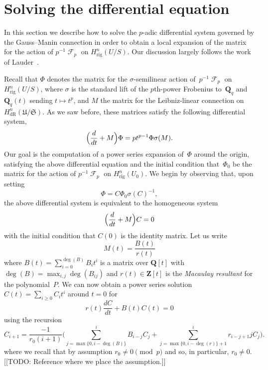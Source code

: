 \documentclass[a4paper,11pt]{article}
\numberwithin{equation}{section}
\DeclareMathOperator{\Frob}{\mathcal{F}} %
\providecommand{\HdR}{H_{\text{dR}}}    %
\providecommand{\Hrig}{H_{\text{rig}}}  %
\theoremstyle{definition}
\begin{document}

\section{Solving the differential equation}
\label{sec:DifferentialSystem}

In this section we describe how to solve the $p$-adic differential 
system governed by the Gauss--Manin connection in order to obtain 
a local expansion of the matrix for the action of $p^{-1} \Frob_p$ 
on $\Hrig^{n}(U/S)$.  Our discussion largely follows the work of 
Lauder~\citep{Lauder2006}.

Recall that $\Phi$ denotes the matrix for the $\sigma$-semilinear action 
of~$p^{-1} \Frob_p$ on $\Hrig^{n}(U/S)$, where $\sigma$ is the standard lift 
of the $p$th-power Frobenius to~$\mathbf{Q}_q$ and~$\mathbf{Q}_q(t)$ sending 
$t \mapsto t^p$, and $M$ the matrix for the Leibniz-linear connection on 
$\HdR^n(\mathfrak{U}/\mathfrak{S})$.
As we saw before, these matrices satisfy the following differential system,
\begin{equation}
\Bigl(\frac{d}{dt} + M\Bigr) \Phi = p t^{p-1} \Phi \sigma(M).
\end{equation}
Our goal is the computation of a power series expansion of~$\Phi$ around 
the origin, satisfying the above differential equation and the initial 
condition that~$\Phi_0$ be the matrix for the action of $p^{-1} \Frob_p$ 
on $\Hrig^n(U_0)$.  We begin by observing that, upon setting 
\begin{equation}
\Phi = C \Phi_0 \sigma(C)^{-1},
\end{equation}
the above differential system is equivalent to the homogeneous system 
\begin{equation} \label{eq:01-GMDE-Homogenous}
\Bigl(\frac{d}{dt} + M\Bigr) C = 0
\end{equation}
with the initial condition that $C(0)$ is the identity matrix.  Let us write 
\begin{equation}
M(t) = \frac{B(t)}{r(t)}
\end{equation}
where $B(t) = \sum_{i=0}^{\deg(B)} B_i t^i$ is a matrix over $\mathbf{Q}[t]$ 
with $\deg(B) = \max_{i,j} \deg(B_{ij})$ and $r(t) \in \mathbf{Z}[t]$ is the 
\emph{Macaulay resultant} for the polynomial~$P$.  We can now obtain a 
power series solution $C(t) = \sum_{i \geq 0} C_i t^i$ around $t=0$ for 
\begin{equation}
r(t) \frac{dC}{dt} + B(t) C(t) = 0
\end{equation}
using the recursion 
\begin{equation} \label{eq:Ci}
C_{i+1} = \frac{-1}{r_0 (i+1)} \biggl(
    \sum_{j=\max{\{0,i-\deg(B)\}}}^i B_{i-j} C_j + 
    \sum_{j=\max{\{0,i-\deg(r)\}}+1}^i r_{i-j+1} j C_j \biggr).
\end{equation}
where we recall that by assumption $r_0 \neq 0 \pmod{p}$ and so, 
in particular, $r_0 \neq 0$.  [[TODO:  Reference where we place 
the assumption.]]
\end{document}
